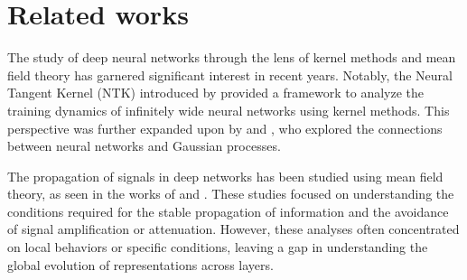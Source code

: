 \documentclass[twoside]{article}
\theoremstyle{definition}
\newcommand{\thomas}[1]{{\color{blue}TH:  \textit{#1}}}
\begin{document}


\section{Related works}
The study of deep neural networks through the lens of kernel methods and mean field theory has garnered significant interest in recent years. Notably, the Neural Tangent Kernel (NTK) introduced by \citet{jacot2018neural} provided a framework to analyze the training dynamics of infinitely wide neural networks using kernel methods. This perspective was further expanded upon by \citet{lee2019wide} and \citet{arora2019exact}, who explored the connections between neural networks and Gaussian processes.

The propagation of signals in deep networks has been studied using mean field theory, as seen in the works of \citet{schoenholz2016deep} and \citet{pennington2017resurrecting}. These studies focused on understanding the conditions required for the stable propagation of information and the avoidance of signal amplification or attenuation. However, these analyses often concentrated on local behaviors or specific conditions, leaving a gap in understanding the global evolution of representations across layers.
\end{document}
